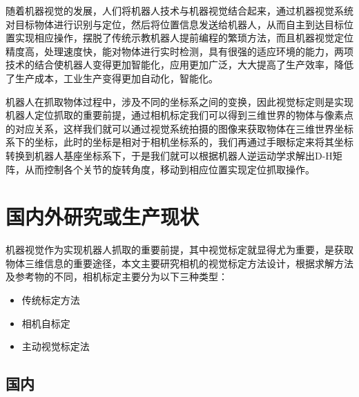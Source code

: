 \documentclass{article}
\begin{document}
随着机器视觉的发展，人们将机器人技术与机器视觉结合起来，通过机器视觉系统对目标物体进行识别与定位，然后将位置信息发送给机器人，从而自主到达目标位置实现相应操作，摆脱了传统示教机器人提前编程的繁琐方法，而且机器视觉定位精度高，处理速度快，能对物体进行实时检测，具有很强的适应环境的能力，两项技术的结合使机器人变得更加智能化，应用更加广泛，大大提高了生产效率，降低了生产成本，工业生产变得更加自动化，智能化。

机器人在抓取物体过程中，涉及不同的坐标系之间的变换，因此视觉标定则是实现机器人定位抓取的重要前提，通过相机标定我们可以得到三维世界的物体与像素点的对应关系，这样我们就可以通过视觉系统拍摄的图像来获取物体在三维世界坐标系下的坐标，此时的坐标是相对于相机坐标系的，我们再通过手眼标定来将其坐标转换到机器人基座坐标系下，于是我们就可以根据机器人逆运动学求解出D-H矩阵，从而控制各个关节的旋转角度，移动到相应位置实现定位抓取操作。









\section{国内外研究或生产现状}
机器视觉作为实现机器人抓取的重要前提，其中视觉标定就显得尤为重要，是获取物体三维信息的重要途径，本文主要研究相机的视觉标定方法设计，根据求解方法及参考物的不同，相机标定主要分为以下三种类型：
\begin{itemize}
	\item 传统标定方法
	\item 相机自标定
	\item 主动视觉标定法
\end{itemize}
\subsection{国内}
\end{document}
